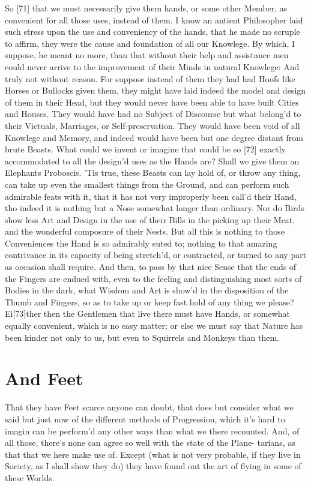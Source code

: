 \documentclass[letterpaper]{book}
\begin{document}
So [71] that we must necessarily give them hands, or some other Member, as
convenient for all those uses, instead of them. I know an antient
Philosopher laid such stress upon the use and conveniency of the hands, that
he made no scruple to affirm, they were the cause and foundation of all our
Knowlege.  By which, I suppose, he meant no more, than that without their
help and assistance men could never arrive to the improvement of their Minds
in natural Knowlege: And truly not without reason. For suppose instead of
them they had had Hoofs like Horses or Bullocks given them, they might have
laid indeed the model and design of them in their Head, but they would never
have been able to have built Cities and Houses. They would have had no
Subject of Discourse but what belong'd to their Victuals, Marriages, or
Self-preservation. They would have been void of all Knowlege and Memory, and
indeed would have been but one degree distant from brute Beasts. What could
we invent or imagine that could be so [72] exactly accommodated to all the
design'd uses as the Hands are? Shall we give them an Elephants Proboscis.
'Tis true, these Beasts can lay hold of, or throw any thing, can take up
even the smallest things from the Ground, and can perform such admirable
feats with it, that it has not very improperly been call'd their Hand, tho
indeed it is nothing but a Nose somewhat longer than ordinary.  Nor do Birds
show less Art and Design in the use of their Bills in the picking up their
Meat, and the wonderful composure of their Nests. But all this is nothing to
those Conveniences the Hand is so admirably suted to; nothing to that
amazing contrivance in its capacity of being stretch'd, or contracted, or
turned to any part as occasion shall require. And then, to pass by that nice
Sense that the ends of the Fingers are endued with, even to the feeling and
distinguishing most sorts of Bodies in the dark, what Wisdom and Art is
show'd in the disposition of the Thumb and Fingers, so as to take up or keep
fast hold of any thing we please? Ei[73]ther then the Gentlemen that live
there must have Hands, or somewhat equally convenient, which is no easy
matter; or else we must say that Nature has been kinder not only to us, but
even to Squirrels and Monkeys than them.


\section{And Feet}

That they have Feet scarce anyone can doubt, that does but consider what we
said but just now of the different methods of Progression, which it's hard
to imagin can be perform'd any other ways than what we there recounted.
And, of all those, there's none can agree so well with the state of the
Plane- tarians, as that that we here make use of. Except (what is not very
probable, if they live in Society, as I shall show they do) they have found
out the art of flying in some of these Worlds.
\end{document}
